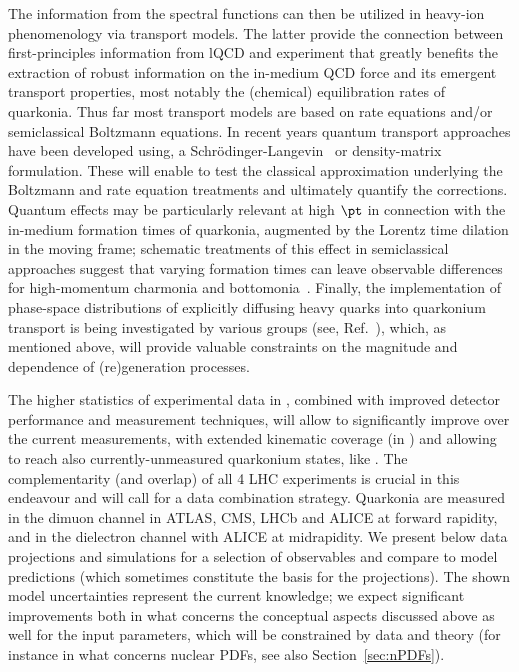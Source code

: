 \documentclass[../report.tex]{subfiles}
\begin{document}
The information from the spectral functions can then be utilized in heavy-ion phenomenology via transport models. The latter provide the connection between first-principles information from lQCD and experiment that greatly benefits the extraction of robust information on the in-medium QCD force and its emergent transport properties, most notably the (chemical) equilibration rates of quarkonia. 
Thus far most transport models are based on rate equations and/or semiclassical Boltzmann equations. In recent years quantum transport approaches have been developed using, \eg a Schr\"odinger-Langevin~\cite{Blaizot:2015hya,Katz:2015qja,Kajimoto:2017rel} or density-matrix~\cite{Akamatsu:2014qsa,Brambilla:2016wgg} formulation. These will enable to test the classical approximation underlying the Boltzmann and rate equation treatments and ultimately quantify the corrections.  Quantum effects may be particularly relevant at high $\pt$ in connection with the in-medium formation times of quarkonia, augmented by the Lorentz time dilation in the moving frame; schematic treatments of this effect in semiclassical approaches suggest that varying formation times can leave observable differences for high-momentum charmonia and bottomonia~\cite{Song:2015bja,Hoelck:2016tqf,Du:2017qkv,Aronson:2017ymv,Krouppa:2017jlg}. 
Finally, the implementation of phase-space distributions of explicitly diffusing heavy quarks into quarkonium transport is being investigated by various groups (see, \eg Ref.~\cite{Yao:2017fuc}), which, as mentioned above, will provide valuable constraints on the magnitude and \pt dependence of (re)generation processes.     


The higher statistics of experimental data in \RunsThreeFour, combined with improved detector performance and measurement techniques, will allow to significantly improve over the current measurements, with extended kinematic coverage (in \pT) and allowing to reach also currently-unmeasured quarkonium states, like 
.
The complementarity (and overlap) of all 4 LHC experiments is crucial in this endeavour and will call for a data combination strategy.
Quarkonia are measured in the dimuon channel in ATLAS, CMS, LHCb and ALICE at forward rapidity, and in the dielectron channel with ALICE at midrapidity.
We present below data projections and simulations for a selection of observables and compare to model predictions (which sometimes constitute the basis for the projections). The shown model uncertainties represent the current knowledge; we expect significant improvements both in what concerns the conceptual aspects discussed above as well for the input parameters, which will be constrained by data and theory (for instance in what concerns nuclear PDFs, see also Section~\ref{sec:nPDFs}).
\end{document}
